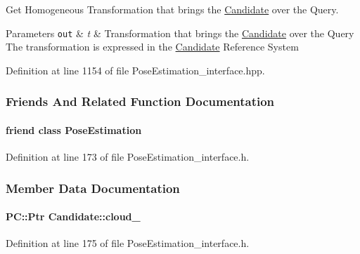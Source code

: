 Get Homogeneous Transformation that brings the \hyperlink{classCandidate}{Candidate} over the Query. 


\begin{DoxyParams}[1]{Parameters}
\mbox{\tt out}  & {\em t} & Transformation that brings the \hyperlink{classCandidate}{Candidate} over the Query The transformation is expressed in the \hyperlink{classCandidate}{Candidate} Reference System \\
\hline
\end{DoxyParams}


Definition at line 1154 of file Pose\-Estimation\-\_\-interface.\-hpp.



\subsubsection{Friends And Related Function Documentation}
\hypertarget{classCandidate_acc93828d970ba58835be2e8221c7a669}{
\paragraph[{Pose\-Estimation}]{\setlength{\rightskip}{0pt plus 5cm}friend class {\bf Pose\-Estimation}\hspace{0.3cm}{\ttfamily [friend]}}}\label{classCandidate_acc93828d970ba58835be2e8221c7a669}


Definition at line 173 of file Pose\-Estimation\-\_\-interface.\-h.



\subsubsection{Member Data Documentation}
\hypertarget{classCandidate_a76f70de142b2d01bf2e5fa8243dd9b2f}{
\paragraph[{cloud\-\_\-}]{\setlength{\rightskip}{0pt plus 5cm}P\-C\-::\-Ptr Candidate\-::cloud\-\_\-\hspace{0.3cm}{\ttfamily [private]}}}\label{classCandidate_a76f70de142b2d01bf2e5fa8243dd9b2f}


Definition at line 175 of file Pose\-Estimation\-\_\-interface.\-h.



